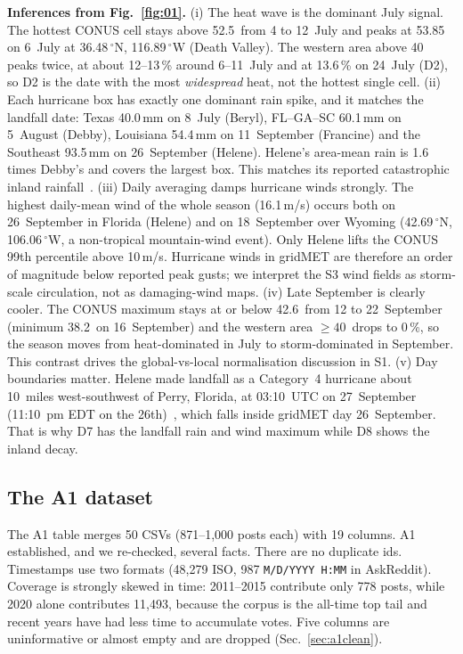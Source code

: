 \textbf{Inferences from Fig.~\ref{fig:01}.}
(i) The heat wave is the dominant July signal. The hottest CONUS cell stays above 52.5\,\degC{} from 4 to 12~July and peaks at
53.85\,\degC{} on 6~July at 36.48\,$^\circ$N, 116.89\,$^\circ$W (Death Valley). The western area above 40\,\degC{} peaks
twice, at about 12--13\,\% around 6--11~July and at 13.6\,\% on 24~July (D2), so D2 is the date with the most
\emph{widespread} heat, not the hottest single cell.
(ii) Each hurricane box has exactly one dominant rain spike, and it matches the landfall date: Texas 40.0\,mm on 8~July (Beryl),
FL--GA--SC 60.1\,mm on 5~August (Debby), Louisiana 54.4\,mm on 11~September (Francine) and the Southeast 93.5\,mm on
26~September (Helene). Helene's area-mean rain is 1.6 times Debby's and covers the largest box. This matches its reported
catastrophic inland rainfall~\cite{nhc_tcr}.
(iii) Daily averaging damps hurricane winds strongly. The highest daily-mean wind of the whole season (16.1\,m/s) occurs
both on 26~September in Florida (Helene) and on 18~September over Wyoming (42.69\,$^\circ$N, 106.06\,$^\circ$W, a
non-tropical mountain-wind event). Only Helene lifts the CONUS 99th percentile above 10\,m/s. Hurricane winds in gridMET
are therefore an order of magnitude below reported peak gusts; we interpret the S3 wind fields as storm-scale circulation,
not as damaging-wind maps.
(iv) Late September is clearly cooler. The CONUS maximum stays at or below 42.6\,\degC{} from 12 to 22~September (minimum 38.2\,\degC{} on 16~September) and the western area
$\ge40$\,\degC{} drops to 0\,\%, so the season moves from heat-dominated in July to storm-dominated in September. This
contrast drives the global-vs-local normalisation discussion in S1.
(v) Day boundaries matter. Helene made landfall as a Category~4 hurricane about 10~miles west-southwest of Perry,
Florida, at 03:10~UTC on 27~September (11:10~pm EDT on the 26th)~\cite{nhc_tcr},
which falls inside gridMET day 26~September. That is why D7 has the landfall rain and wind maximum while D8 shows the inland
decay.

\subsection{The A1 dataset}
The A1 table merges 50 CSVs (871--1,000 posts each) with 19 columns. A1 established, and we re-checked, several facts.
There are no duplicate ids. Timestamps use two formats (48,279 ISO, 987 \texttt{M/D/YYYY H:MM} in AskReddit). Coverage
is strongly skewed in time: 2011--2015 contribute only 778 posts, while 2020 alone contributes 11,493, because the
corpus is the all-time top tail and recent years have had less time to accumulate votes. Five columns are uninformative
or almost empty and are dropped (Sec.~\ref{sec:a1clean}).
